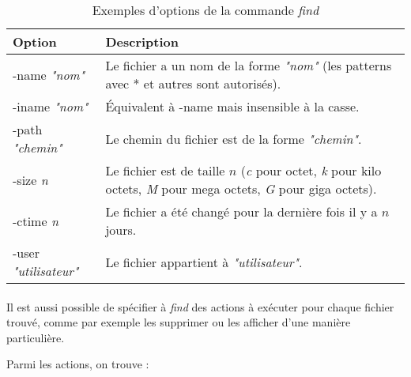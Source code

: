 \begin{table}[h]
	\centering
    \begin{tabular}{|l|p{10cm}|}
        \hline
        \textbf{Option}              & \textbf{Description}\\
        \hline
        -name \textit{"nom"}         & Le fichier a un nom de la forme
                                       \textit{"nom"} (les patterns avec * et
									   autres sont autorisés).\\
        \hline
        -iname \textit{"nom"}        & Équivalent à -name mais insensible à la
		                               casse.\\
        \hline
        -path \textit{"chemin"}      & Le chemin du fichier est de la forme
                                       \textit{"chemin"}.\\
        \hline
        -size \textit{n}             & Le fichier est de taille $n$
                                       (\textit{c} pour octet, \textit{k} pour
									   kilo octets, \textit{M} pour mega
									   octets, \textit{G} pour giga octets).\\
        \hline
        -ctime \textit{n}            & Le fichier a été changé pour la dernière
		                               fois il y a $n$ jours. \\
        \hline
        -user \textit{"utilisateur"} & Le fichier appartient à
                                       \textit{"utilisateur"}.\\
		\hline
    \end{tabular}
	\caption{Exemples d'options de la commande \emph{find}}
	\label{tab:find-opts}
\end{table}

\paragraph{}
Il est aussi possible de spécifier à \emph{find} des actions à exécuter pour
chaque fichier trouvé, comme par exemple les supprimer ou les afficher d'une
manière particulière.

Parmi les actions, on trouve :

